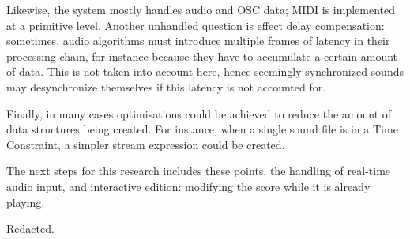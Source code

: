 \documentclass{article}
\begin{document}
Likewise, the system mostly handles audio and OSC data; MIDI is implemented at a primitive level.
Another unhandled question is effect delay compensation: sometimes, audio algorithms must introduce multiple frames of latency in their processing chain, for instance because they have to accumulate a certain amount of data.
This is not taken into account here, hence seemingly synchronized sounds may desynchronize themselves if this latency is not accounted for.

Finally, in many cases optimisations could be achieved to reduce the amount of data structures being created. For instance, when a single sound file is in a Time Constraint, a simpler stream expression could be created.

The next steps for this research includes these points, the handling of real-time audio input, and interactive edition: modifying the score while it is already playing.

\begin{acknowledgments}
Redacted.%
\end{acknowledgments} 


\end{document}
